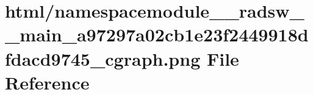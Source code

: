 \hypertarget{namespacemodule____radsw____main__a97297a02cb1e23f2449918dfdacd9745__cgraph_8png}{}\section{html/namespacemodule\+\_\+\+\_\+radsw\+\_\+\+\_\+main\+\_\+a97297a02cb1e23f2449918dfdacd9745\+\_\+cgraph.png File Reference}
\label{namespacemodule____radsw____main__a97297a02cb1e23f2449918dfdacd9745__cgraph_8png}
